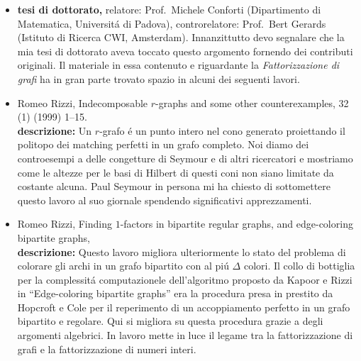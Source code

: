 \documentclass[10pt]{article}
\begin{document}
\begin{itemize}
  \vspace{1.4mm}
  \item[] {\bf tesi di dottorato,}
          relatore: {\sc Prof.~Michele Conforti}
          (Dipartimento di Matematica, Universit\'a di Padova),
          controrelatore: {\sc Prof.~Bert Gerards}
          (Istituto di Ricerca CWI, Amsterdam).
          Innanzittutto devo segnalare che la
          mia tesi di dottorato aveva toccato questo argomento
          fornendo dei contributi originali.
          Il materiale in essa contenuto e riguardante
          la {\em Fattorizzazione di grafi} ha in gran parte trovato
          spazio in alcuni dei seguenti lavori.\\

  \vspace{1.4mm}
  \item[] {\sc Romeo Rizzi},
   \newblock  Indecomposable $r$-graphs and some other counterexamples,
    32 (1) (1999) 1--15.\\
{\bf descrizione:}
Un $r$-grafo
\'e un punto intero nel cono
generato proiettando il politopo dei matching
perfetti in un grafo completo.
Noi diamo dei controesempi a delle congetture
di Seymour e di altri ricercatori
e mostriamo come le altezze per le basi
di Hilbert di questi coni non siano limitate
da costante alcuna.
Paul Seymour in persona mi ha chiesto
di sottomettere questo lavoro al suo giornale
spendendo significativi apprezzamenti.\\

  \vspace{1.4mm}
  \item[] {\sc Romeo Rizzi},
   \newblock  Finding $1$-factors in bipartite regular graphs,
              and edge-coloring bipartite graphs,
    \\
{\bf descrizione:}
Questo lavoro migliora ulteriormente
lo stato del problema di colorare gli archi in un grafo
bipartito con al pi\'u $\Delta$ colori.
Il collo di bottiglia per la complessit\'a
computazionele dell'algoritmo proposto
da Kapoor
e Rizzi in ``Edge-coloring bipartite graphs''
era la procedura presa in prestito da Hopcroft e Cole
per il reperimento di un accoppiamento perfetto
in un grafo bipartito e regolare.
Qui si migliora su questa procedura
grazie a degli argomenti algebrici.
In lavoro mette in luce il legame tra
la fattorizzazione di grafi e la fattorizzazione
di numeri interi.\\


\end{itemize}
\end{document}
